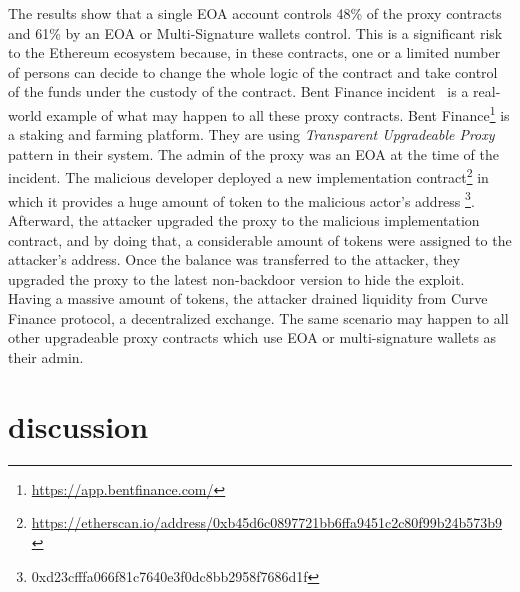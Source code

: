 The results show that a single EOA account controls 48\% of the proxy contracts and 61\% by an EOA or Multi-Signature wallets control. This is a significant risk to the Ethereum ecosystem because, in these contracts, one or a limited number of persons can decide to change the whole logic of the contract and take control of the funds under the custody of the contract.
Bent Finance incident~\cite{bentFinanceHack} is a real-world example of what may happen to all these proxy contracts. Bent Finance\footnote{\url{https://app.bentfinance.com/}} is a staking and farming platform. They are using \textit{Transparent Upgradeable Proxy} pattern in their system. The admin of the proxy was an EOA at the time of the incident. The malicious developer deployed a new implementation contract\footnote{\url{https://etherscan.io/address/0xb45d6c0897721bb6ffa9451c2c80f99b24b573b9}} in which it provides a huge amount of token to the malicious actor's address \footnote{0xd23cfffa066f81c7640e3f0dc8bb2958f7686d1f}. 
Afterward, the attacker upgraded the proxy to the malicious implementation contract, and by doing that, a considerable amount of tokens were assigned to the attacker's address. Once the balance was transferred to the attacker, they upgraded the proxy to the latest non-backdoor version to hide the exploit. 
Having a massive amount of tokens, the attacker drained liquidity from Curve Finance protocol, a decentralized exchange.
The same scenario may happen to all other upgradeable proxy contracts which use EOA or multi-signature wallets as their admin.







\section{discussion}


